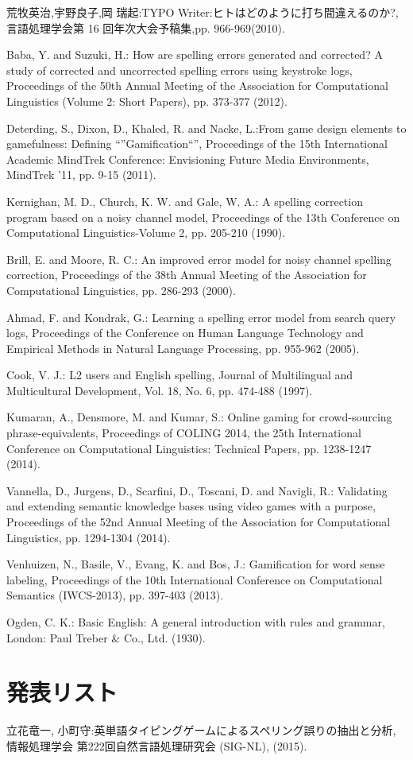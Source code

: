  \begin{thebibliography}{99}
	 荒牧英治,宇野良子,岡 瑞起:TYPO Writer:ヒトはどのように打ち間違えるのか?,言語処理学会第 16 回年次大会予稿集,pp. 966-969(2010).
	
	 Baba, Y. and Suzuki, H.: How are spelling errors generated and corrected? A study of corrected and uncorrected spelling errors using keystroke logs, Proceedings of the 50th Annual Meeting of the Association for Computational Linguistics (Volume 2: Short Papers), pp. 373-377 (2012).

	 Deterding, S., Dixon, D., Khaled, R. and Nacke, L.:From game design elements to gamefulness: Defining “”Gamification“”, Proceedings of the 15th International Academic MindTrek Conference: Envisioning Future Media Environments, MindTrek ’11, pp. 9-15 (2011).

	 Kernighan, M. D., Church, K. W. and Gale, W. A.: A spelling correction program based on a noisy channel model, Proceedings of the 13th Conference on Computational Linguistics-Volume 2, pp. 205-210 (1990).

	 Brill, E. and Moore, R. C.: An improved error model for noisy channel spelling correction, Proceedings of the 38th Annual Meeting of the Association for Computational Linguistics, pp. 286-293 (2000).

	 Ahmad, F. and Kondrak, G.: Learning a spelling error model from search query logs, Proceedings of the Conference on Human Language Technology and Empirical Methods in Natural Language Processing, pp. 955-962 (2005).

	 Cook, V. J.: L2 users and English spelling, Journal of Multilingual and Multicultural Development, Vol. 18, No. 6, pp. 474-488 (1997).

	 Kumaran, A., Densmore, M. and Kumar, S.: Online gaming for crowd-sourcing phrase-equivalents, Proceedings of COLING 2014, the 25th International Conference on Computational Linguistics: Technical Papers, pp. 1238-1247 (2014).

	 Vannella, D., Jurgens, D., Scarfini, D., Toscani, D. and Navigli, R.: Validating and extending semantic knowledge bases using video games with a purpose, Proceedings of the 52nd Annual Meeting of the Association for Computational Linguistics, pp. 1294-1304 (2014).

	 Venhuizen, N., Basile, V., Evang, K. and Bos, J.: Gamification for word sense labeling, Proceedings of the 10th International Conference on Computational Semantics (IWCS-2013), pp. 397-403 (2013).

	 Ogden, C. K.: Basic English: A general introduction with rules and grammar, London: Paul Treber \& Co., Ltd. (1930).


 \end{thebibliography}


 \newpage

 \section*{\Large 発表リスト}
 \noindent [NL222] 立花竜一, 小町守:英単語タイピングゲームによるスペリング誤りの抽出と分析, 情報処理学会 第222回自然言語処理研究会 (SIG-NL), (2015).